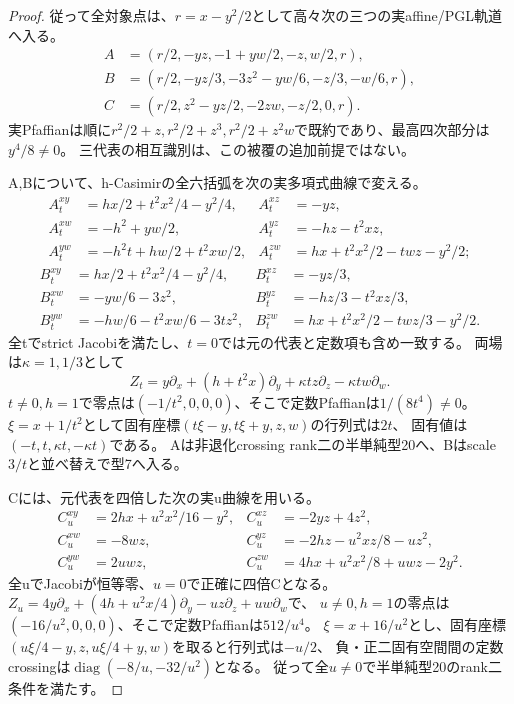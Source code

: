 \documentclass[a4paper,11pt]{ltjsarticle}
\theoremstyle{definition}
\begin{document}
\begin{proof}
従って全対象点は、$r=x-y^2/2$として高々次の三つの実affine/PGL軌道へ入る。
\[
\begin{aligned}
 A&=(r/2,-yz,-1+yw/2,-z,w/2,r),\\
 B&=(r/2,-yz/3,-3z^2-yw/6,-z/3,-w/6,r),\\
 C&=(r/2,z^2-yz/2,-2zw,-z/2,0,r).
\end{aligned}
\]
実Pfaffianは順に$r^2/2+z,r^2/2+z^3,r^2/2+z^2w$で既約であり、最高四次部分は$y^4/8\ne0$。
三代表の相互識別は、この被覆の追加前提ではない。

A,Bについて、h-Casimirの全六括弧を次の実多項式曲線で変える。
\[
\begin{aligned}
 A_t^{xy}&=hx/2+t^2x^2/4-y^2/4,&A_t^{xz}&=-yz,\\
 A_t^{xw}&=-h^2+yw/2,&A_t^{yz}&=-hz-t^2xz,\\
 A_t^{yw}&=-h^2t+hw/2+t^2xw/2,&
 A_t^{zw}&=hx+t^2x^2/2-twz-y^2/2;
\end{aligned}
\]
\[
\begin{aligned}
 B_t^{xy}&=hx/2+t^2x^2/4-y^2/4,&B_t^{xz}&=-yz/3,\\
 B_t^{xw}&=-yw/6-3z^2,&B_t^{yz}&=-hz/3-t^2xz/3,\\
 B_t^{yw}&=-hw/6-t^2xw/6-3tz^2,&
 B_t^{zw}&=hx+t^2x^2/2-twz/3-y^2/2.
\end{aligned}
\]
全tでstrict Jacobiを満たし、$t=0$では元の代表と定数項も含め一致する。
両場は$\kappa=1,1/3$として
\[
 Z_t=y\partial_x+(h+t^2x)\partial_y+\kappa tz\partial_z-\kappa tw\partial_w.
\]
$t\ne0,h=1$で零点は$(-1/t^2,0,0,0)$、そこで定数Pfaffianは$1/(8t^4)\ne0$。
$\xi=x+1/t^2$として固有座標$(t\xi-y,t\xi+y,z,w)$の行列式は$2t$、
固有値は$(-t,t,\kappa t,-\kappa t)$である。
Aは非退化crossing rank二の半単純型20へ、Bはscale$3/t$と並べ替えで型7へ入る。

Cには、元代表を四倍した次の実u曲線を用いる。
\[
\begin{aligned}
 C_u^{xy}&=2hx+u^2x^2/16-y^2,&C_u^{xz}&=-2yz+4z^2,\\
 C_u^{xw}&=-8wz,&C_u^{yz}&=-2hz-u^2xz/8-uz^2,\\
 C_u^{yw}&=2uwz,&C_u^{zw}&=4hx+u^2x^2/8+uwz-2y^2.
\end{aligned}
\]
全uでJacobiが恒等零、$u=0$で正確に四倍Cとなる。
$Z_u=4y\partial_x+(4h+u^2x/4)\partial_y-uz\partial_z+uw\partial_w$で、
$u\ne0,h=1$の零点は$(-16/u^2,0,0,0)$、そこで定数Pfaffianは$512/u^4$。
$\xi=x+16/u^2$とし、固有座標
$(u\xi/4-y,z,u\xi/4+y,w)$を取ると行列式は$-u/2$、
負・正二固有空間間の定数crossingは$\operatorname{diag}(-8/u,-32/u^2)$となる。
従って全$u\ne0$で半単純型20のrank二条件を満たす。


\end{proof}
\end{document}
